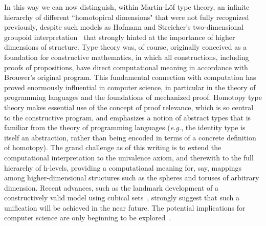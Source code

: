 \documentclass[11pt]{article}
\begin{document}
In this way we can now distinguish, within Martin-L\"{o}f type theory, an infinite hierarchy of different ``homotopical
dimensions" that were not fully recognized previously, despite such models as Hofmann and Streicher's two-dimensional
groupoid interpretation~\cite{HS} that strongly hinted at the importance of higher dimensions of structure.  Type theory
was, of course, originally conceived as a foundation for constructive mathematics, in which all constructions, including
proofs of propositions, have direct computational meaning in accordance with Brouwer's original program.  This
fundamental connection with computation has proved enormously influential in computer science, in particular in the
theory of programming languages and the foundations of mechanized proof.  Homotopy type theory makes essential use of the
concept of proof relevance, which is so central to the constructive program, and emphasizes a notion of abstract types that is
familiar from the theory of programming languages (\textit{e.g.}, the identity type is itself an abstraction, rather than being encoded in terms of a concrete definition of homotopy).  The grand challenge as of this writing is to
extend the computational interpretation to the univalence axiom, and therewith to the full hierarchy of h-levels, providing a computational meaning for, say, mappings among higher-dimensional structures such as the spheres and toruses of arbitrary dimension.  Recent advances,
such as the landmark development of a constructively valid model using cubical sets~\cite{BCH}, strongly suggest that
such a unification will be achieved in the near future.  The potential implications for computer science are only
beginning to be explored~\cite{AMLH}.
\end{document}
